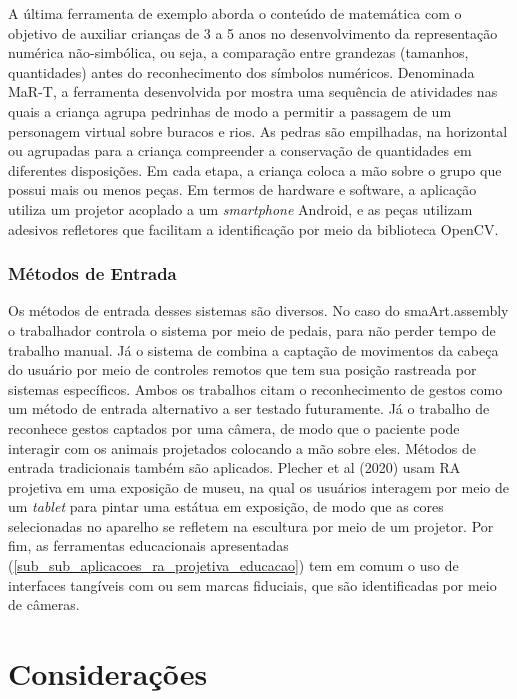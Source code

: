 A última ferramenta de exemplo aborda o conteúdo de matemática com o objetivo de auxiliar crianças de 3 a 5 anos no desenvolvimento da representação numérica não-simbólica, ou seja, a comparação entre grandezas (tamanhos, quantidades) antes do reconhecimento dos símbolos numéricos. Denominada MaR-T, a ferramenta desenvolvida por  mostra uma sequência de atividades nas quais a criança agrupa pedrinhas de modo a permitir a passagem de um personagem virtual sobre buracos e rios. As pedras são empilhadas, na horizontal ou agrupadas para a criança compreender a conservação de quantidades em diferentes disposições. Em cada etapa, a criança coloca a mão sobre o grupo que possui mais ou menos peças. Em termos de hardware e software, a aplicação utiliza um projetor acoplado a um \textit{smartphone} Android, e as peças utilizam adesivos refletores que facilitam a identificação por meio da biblioteca OpenCV.

\subsubsection{Métodos de Entrada}
Os métodos de entrada desses sistemas são diversos. No caso do smaArt.assembly o trabalhador controla o sistema por meio de pedais, para não perder tempo de trabalho manual. Já o sistema de  combina a captação de movimentos da cabeça do usuário por meio de controles remotos que tem sua posição rastreada por sistemas específicos. Ambos os trabalhos citam o reconhecimento de gestos como um método de entrada alternativo a ser testado futuramente. Já o trabalho de  reconhece gestos captados por uma câmera, de modo que o paciente pode interagir com os animais projetados colocando a mão sobre eles. Métodos de entrada tradicionais também são aplicados. Plecher et al (2020) usam RA projetiva em uma exposição de museu, na qual os usuários interagem por meio de um \textit{tablet} para pintar uma estátua em exposição, de modo que as cores selecionadas no aparelho se refletem na escultura por meio de um projetor. Por fim, as ferramentas educacionais apresentadas (\autoref{sub_sub_aplicacoes_ra_projetiva_educacao}) tem em comum o uso de interfaces tangíveis com ou sem marcas fiduciais, que são identificadas por meio de câmeras.

\section{Considerações}

